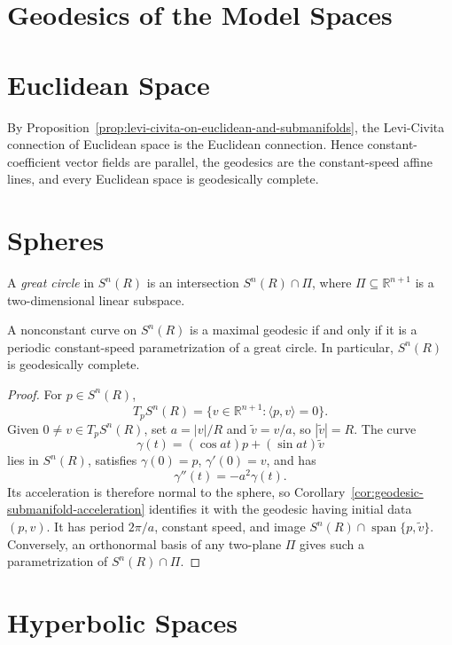 \section{Geodesics of the Model Spaces}

\section{Euclidean Space}

By Proposition~\ref{prop:levi-civita-on-euclidean-and-submanifolds}, the
Levi-Civita connection of Euclidean space is the Euclidean connection. Hence
constant-coefficient vector fields are parallel, the geodesics are the
constant-speed affine lines, and every Euclidean space is geodesically complete.

\section{Spheres}

A \emph{great circle} in $S^n(R)$ is an intersection $S^n(R)\cap\Pi$, where
$\Pi\subseteq\mathbb R^{n+1}$ is a two-dimensional linear subspace.

\begin{proposition}
\label{prop:maximal-geodesic-sphere}
A nonconstant curve on $S^n(R)$ is a maximal geodesic if and only if it is a
periodic constant-speed parametrization of a great circle. In particular,
$S^n(R)$ is geodesically complete.

\begin{proof}
\sketch For $p\in S^n(R)$,
\[
T_pS^n(R)=\{v\in\mathbb R^{n+1}:\langle p,v\rangle=0\}.
\]
Given $0\ne v\in T_pS^n(R)$, set $a=|v|/R$ and
$\widetilde v=v/a$, so $|\widetilde v|=R$. The curve
\[
\gamma(t)=(\cos at)p+(\sin at)\widetilde v
\]
lies in $S^n(R)$, satisfies $\gamma(0)=p$, $\gamma'(0)=v$, and has
\[
\gamma''(t)=-a^2\gamma(t).
\]
Its acceleration is therefore normal to the sphere, so
Corollary~\ref{cor:geodesic-submanifold-acceleration} identifies it with the
geodesic having initial data $(p,v)$. It has period $2\pi/a$, constant speed,
and image $S^n(R)\cap\operatorname{span}\{p,\widetilde v\}$. Conversely, an
orthonormal basis of any two-plane $\Pi$ gives such a parametrization of
$S^n(R)\cap\Pi$.
\end{proof}
\end{proposition}

\section{Hyperbolic Spaces}


